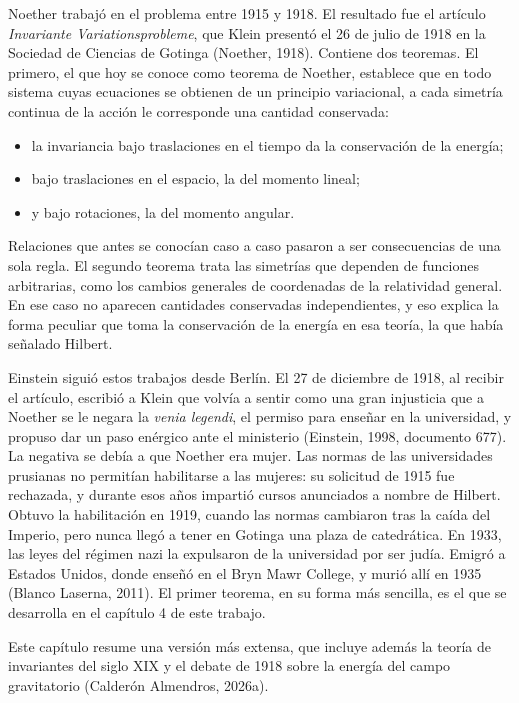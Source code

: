 \documentclass[11pt,a4paper,spanish]{book}
\providecommand{\tightlist}{%
  \setlength{\itemsep}{0pt}\setlength{\parskip}{0pt}}
\begin{document}
Noether trabajó en el problema entre 1915 y 1918. El resultado fue el
artículo \emph{Invariante Variationsprobleme}, que Klein presentó el 26
de julio de 1918 en la Sociedad de Ciencias de Gotinga (Noether, 1918).
Contiene dos teoremas. El primero, el que hoy se conoce como teorema de
Noether, establece que en todo sistema cuyas ecuaciones se obtienen de
un principio variacional, a cada simetría continua de la acción le
corresponde una cantidad conservada:

\begin{itemize}
\tightlist
\item
  la invariancia bajo traslaciones en el tiempo da la conservación de la
  energía;
\item
  bajo traslaciones en el espacio, la del momento lineal;
\item
  y bajo rotaciones, la del momento angular.
\end{itemize}

Relaciones que antes se conocían caso a caso pasaron a ser consecuencias
de una sola regla. El segundo teorema trata las simetrías que dependen
de funciones arbitrarias, como los cambios generales de coordenadas de
la relatividad general. En ese caso no aparecen cantidades conservadas
independientes, y eso explica la forma peculiar que toma la conservación
de la energía en esa teoría, la que había señalado Hilbert.

Einstein siguió estos trabajos desde Berlín. El 27 de diciembre de 1918,
al recibir el artículo, escribió a Klein que volvía a sentir como una
gran injusticia que a Noether se le negara la \emph{venia legendi}, el
permiso para enseñar en la universidad, y propuso dar un paso enérgico
ante el ministerio (Einstein, 1998, documento 677). La negativa se debía
a que Noether era mujer. Las normas de las universidades prusianas no
permitían habilitarse a las mujeres: su solicitud de 1915 fue rechazada,
y durante esos años impartió cursos anunciados a nombre de Hilbert.
Obtuvo la habilitación en 1919, cuando las normas cambiaron tras la
caída del Imperio, pero nunca llegó a tener en Gotinga una plaza de
catedrática. En 1933, las leyes del régimen nazi la expulsaron de la
universidad por ser judía. Emigró a Estados Unidos, donde enseñó en el
Bryn Mawr College, y murió allí en 1935 (Blanco Laserna, 2011). El
primer teorema, en su forma más sencilla, es el que se desarrolla en el
capítulo 4 de este trabajo.

Este capítulo resume una versión más extensa, que incluye además la
teoría de invariantes del siglo XIX y el debate de 1918 sobre la energía
del campo gravitatorio (Calderón Almendros, 2026a).
\end{document}
